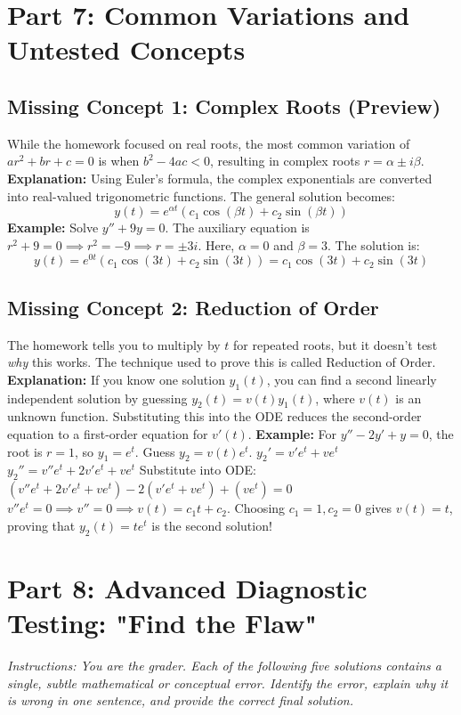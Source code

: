 \documentclass[12pt]{article}
\begin{document}
\newpage
\section{Part 7: Common Variations and Untested Concepts}

\subsection{Missing Concept 1: Complex Roots (Preview)}
While the homework focused on real roots, the most common variation of $a r^2 + b r + c = 0$ is when $b^2 - 4ac < 0$, resulting in complex roots $r = \alpha \pm i\beta$. 
\textbf{Explanation:} Using Euler's formula, the complex exponentials are converted into real-valued trigonometric functions. The general solution becomes:
\[ y(t) = e^{\alpha t} (c_1 \cos(\beta t) + c_2 \sin(\beta t)) \]
\textbf{Example:} Solve $y'' + 9y = 0$.
The auxiliary equation is $r^2 + 9 = 0 \implies r^2 = -9 \implies r = \pm 3i$.
Here, $\alpha = 0$ and $\beta = 3$. The solution is:
\[ y(t) = e^{0t} (c_1 \cos(3t) + c_2 \sin(3t)) = c_1 \cos(3t) + c_2 \sin(3t) \]

\subsection{Missing Concept 2: Reduction of Order}
The homework tells you to multiply by $t$ for repeated roots, but it doesn't test \textit{why} this works. The technique used to prove this is called Reduction of Order.
\textbf{Explanation:} If you know one solution $y_1(t)$, you can find a second linearly independent solution by guessing $y_2(t) = v(t)y_1(t)$, where $v(t)$ is an unknown function. Substituting this into the ODE reduces the second-order equation to a first-order equation for $v'(t)$.
\textbf{Example:} For $y'' - 2y' + y = 0$, the root is $r=1$, so $y_1 = e^t$.
Guess $y_2 = v(t)e^t$.
$y_2' = v'e^t + ve^t$
$y_2'' = v''e^t + 2v'e^t + ve^t$
Substitute into ODE:
$(v''e^t + 2v'e^t + ve^t) - 2(v'e^t + ve^t) + (ve^t) = 0$
$v''e^t = 0 \implies v'' = 0 \implies v(t) = c_1 t + c_2$.
Choosing $c_1=1, c_2=0$ gives $v(t) = t$, proving that $y_2(t) = t e^t$ is the second solution!

\newpage
\section{Part 8: Advanced Diagnostic Testing: "Find the Flaw"}
\textit{Instructions: You are the grader. Each of the following five solutions contains a single, subtle mathematical or conceptual error. Identify the error, explain why it is wrong in one sentence, and provide the correct final solution.}
\end{document}
